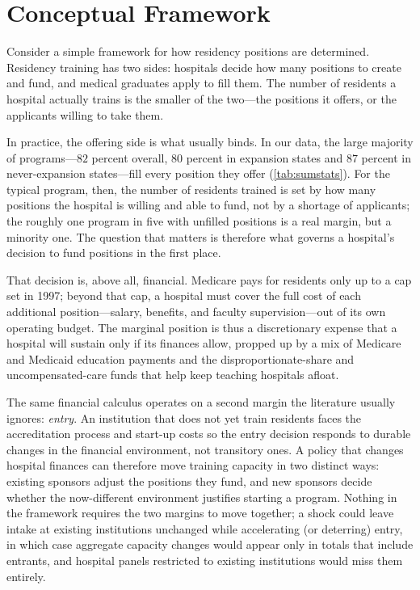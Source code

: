 \section{Conceptual Framework}\label{sec:model}

Consider a simple framework for how residency positions are determined. Residency training has two sides: hospitals decide how many positions to create and fund, and medical graduates apply to fill them. The number of residents a hospital actually trains is the smaller of the two---the positions it offers, or the applicants willing to take them.

In practice, the offering side is what usually binds. In our data, the large majority of programs---$82$ percent overall, $80$ percent in expansion states and $87$ percent in never-expansion states---fill every position they offer (\cref{tab:sumstats}). For the typical program, then, the number of residents trained is set by how many positions the hospital is willing and able to fund, not by a shortage of applicants; the roughly one program in five with unfilled positions is a real margin, but a minority one. The question that matters is therefore what governs a hospital's decision to fund positions in the first place.

That decision is, above all, financial. Medicare pays for residents only up to a cap set in 1997; beyond that cap, a hospital must cover the full cost of each additional position---salary, benefits, and faculty supervision---out of its own operating budget. The marginal position is thus a discretionary expense that a hospital will sustain only if its finances allow, propped up by a mix of Medicare and Medicaid education payments and the disproportionate-share and uncompensated-care funds that help keep teaching hospitals afloat.

The same financial calculus operates on a second margin the literature usually ignores: \emph{entry}. An institution that does not yet train residents faces the accreditation process and start-up costs so the entry decision responds to durable changes in the financial environment, not transitory ones. A policy that changes hospital finances can therefore move training capacity in two distinct ways: existing sponsors adjust the positions they fund, and new sponsors decide whether the now-different environment justifies starting a program. Nothing in the framework requires the two margins to move together; a shock could leave intake at existing institutions unchanged while accelerating (or deterring) entry, in which case aggregate capacity changes would appear only in totals that include entrants, and hospital panels restricted to existing institutions would miss them entirely.

